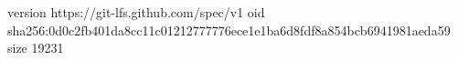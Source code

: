 version https://git-lfs.github.com/spec/v1
oid sha256:0d0c2fb401da8cc11c01212777776ece1e1ba6d8fdf8a854bcb6941981aeda59
size 19231
